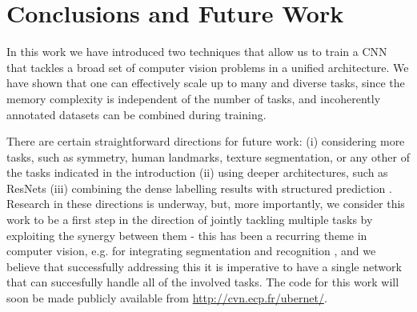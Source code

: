 \documentclass[10pt,twocolumn,letterpaper]{article}
\begin{document}


	

	
\mycomment{
	\begin{figure*}
			{\setlength{\tabcolsep}{.1em}	
			\begin{tabular}{cccccccc}
		
		\resline{4}
		\resline{7}
		\resline{8}
		\resline{12}
		\resline{16}
				\resline{19}
	\resline{21}
		\resline{25}
			\resline{26}	
							\resline{28}
								\resline{33}
								\resline{30}

		\end{tabular}
	}
	\end{figure*}
}

\section{Conclusions and Future Work}
In this work we have introduced two techniques that allow us to train a  CNN that tackles a broad set of computer vision problems in a unified architecture. We have shown that one can effectively scale up to  many and diverse tasks, since 
the memory complexity is independent of the number of tasks, and incoherently annotated datasets can be combined during training.



There are certain straightforward directions for future work: (i) considering more tasks, such as symmetry, human landmarks, texture segmentation, or any other of the tasks indicated in the introduction (ii) using deeper architectures, such as ResNets \cite{HeZRS15} (iii) combining the dense labelling results with structured prediction
\cite{Adelaide,ChenPK0Y16,crfrnn,ChandraK16}. Research in these directions is underway, but, more importantly, we consider this work to be a first step in the direction of jointly tackling multiple tasks by exploiting the synergy between them - this has been a recurring theme in computer vision, e.g.  for integrating segmentation and recognition \cite{Keeler90,mumf94b,BottouBL97,TCYZ03,KoMa05,KTZ05,MaireYP11}, and we believe that successfully addressing this it is imperative to have a single network that can succesfully handle all of the involved tasks. 
The code for this work will soon be made publicly available from \url{http://cvn.ecp.fr/ubernet/}.
\end{document}

